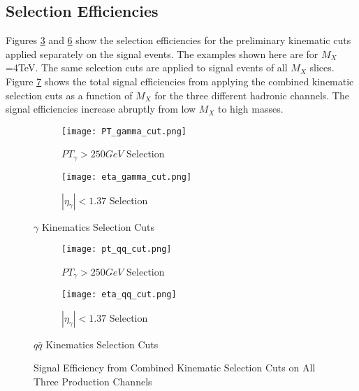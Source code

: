 \documentclass[12pt]{article}
\begin{document}
\subsection{Selection Efficiencies}
Figures \ref{gamma_cuts} and \ref{qq_cuts} show the selection efficiencies for the preliminary kinematic cuts applied separately on the signal events. The examples shown here are for $M_X$=4TeV. The same selection cuts are applied to signal events of all $M_X$ slices. Figure \ref{total_efficiency} shows the total signal efficiencies from applying the combined kinematic selection cuts as a function of $M_X$ for the three different hadronic channels. The signal efficiencies increase abruptly from low $M_X$ to high masses.

\begin{figure}
\centering
\begin{subfigure}{.5\textwidth}
  \centering
  \texttt{[image: PT\_gamma\_cut.png]}
  \caption{$PT_\gamma>250GeV$ Selection}
  \label{pt_gamma_cut}
\end{subfigure}%
\begin{subfigure}{.5\textwidth}
  \centering
  \texttt{[image: eta\_gamma\_cut.png]}
  \caption{$|\eta_\gamma|<1.37$ Selection}
  \label{eta_gamma_cut}
\end{subfigure}
\caption{$\gamma$ Kinematics Selection Cuts}
\label{gamma_cuts}
\end{figure}

\begin{figure}
\centering
\begin{subfigure}{.5\textwidth}
  \centering
  \texttt{[image: pt\_qq\_cut.png]}
  \caption{$PT_\gamma>250GeV$ Selection}
  \label{pt_gamma_cut}
\end{subfigure}%
\begin{subfigure}{.5\textwidth}
  \centering
  \texttt{[image: eta\_qq\_cut.png]}
  \caption{$|\eta_\gamma|<1.37$ Selection}
  \label{eta_gamma_cut}
\end{subfigure}
\caption{$q\bar{q}$ Kinematics Selection Cuts}
\label{qq_cuts}
\end{figure}

\begin{figure}[H]
\begin{center}
\caption[Caption for LOF]{Signal Efficiency from Combined Kinematic Selection Cuts on All Three Production Channels}
\label{total_efficiency}
\end{center}
\end{figure}
\end{document}
